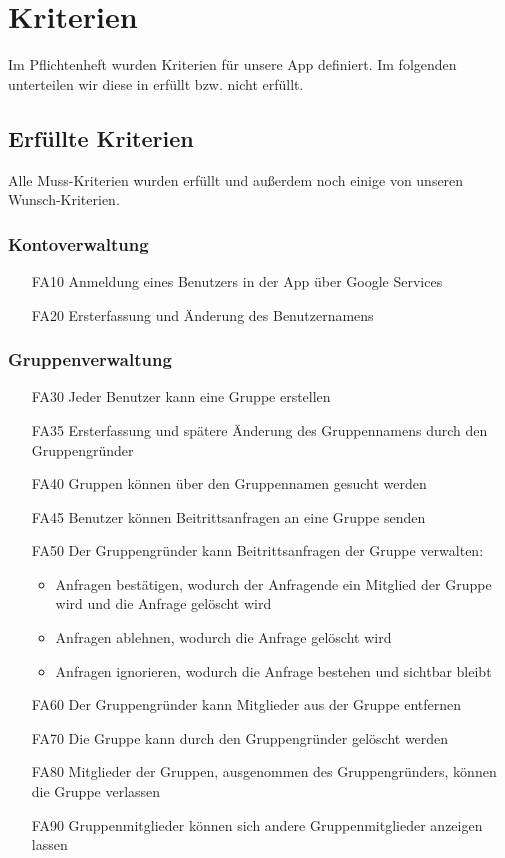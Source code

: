 \documentclass{scrartcl}
\begin{document}
	\newpage
	\section{Kriterien}
	Im Pflichtenheft wurden Kriterien für unsere App definiert. Im folgenden unterteilen wir diese in erfüllt bzw. nicht erfüllt.

	
	\subsection{Erfüllte Kriterien}
		Alle Muss-Kriterien wurden erfüllt und außerdem noch einige von unseren Wunsch-Kriterien.
		
	\subsubsection{Kontoverwaltung}
	\begin{itemize}
		\item[FA10] Anmeldung eines Benutzers in der App über Google Services
		\item[FA20] Ersterfassung und Änderung des Benutzernamens
	\end{itemize}
	
	\subsubsection{Gruppenverwaltung}
	\begin{itemize}
		\item[FA30] Jeder Benutzer kann eine Gruppe erstellen
		\item[FA35] Ersterfassung und spätere Änderung des Gruppennamens durch den Gruppengründer
		\item[FA40] Gruppen können über den Gruppennamen gesucht werden
		\item[FA45] Benutzer können Beitrittsanfragen an eine Gruppe senden
		\item[FA50] Der Gruppengründer kann Beitrittsanfragen der Gruppe verwalten:
		\begin{itemize}
			\item Anfragen bestätigen, wodurch der Anfragende ein Mitglied der Gruppe wird und die Anfrage gelöscht wird
			\item Anfragen ablehnen, wodurch die Anfrage gelöscht wird
			\item Anfragen ignorieren, wodurch die Anfrage bestehen und sichtbar bleibt
		\end{itemize}
		\item[FA60] Der Gruppengründer kann Mitglieder aus der Gruppe entfernen
		\item[FA70] Die Gruppe kann durch den Gruppengründer gelöscht werden
		\item[FA80] Mitglieder der Gruppen, ausgenommen des Gruppengründers, können die Gruppe verlassen
		\item[FA90] Gruppenmitglieder können sich andere Gruppenmitglieder anzeigen lassen
	\end{itemize}
	
\end{document}
